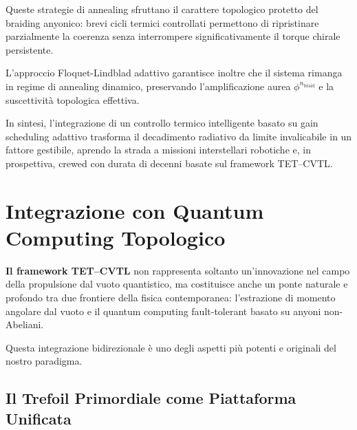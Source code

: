 \documentclass[11pt,a4paper]{article}
\theoremstyle{plain}
\theoremstyle{definition}
\begin{document}
\vspace{0.2cm}

Queste strategie di annealing sfruttano il carattere topologico protetto del braiding anyonico: brevi cicli termici controllati permettono di ripristinare parzialmente la coerenza senza interrompere significativamente il torque chirale persistente. 

\vspace{0.2cm}

L'approccio Floquet-Lindblad adattivo garantisce inoltre che il sistema rimanga in regime di annealing dinamico, preservando l'amplificazione aurea \(\phi^{n_{\text{braid}}}\) e la suscettività topologica effettiva.

\vspace{0.2cm}

In sintesi, l'integrazione di un controllo termico intelligente basato su gain scheduling adattivo trasforma il decadimento radiativo da limite invalicabile in un fattore gestibile, aprendo la strada a missioni interstellari robotiche e, in prospettiva, crewed con durata di decenni basate sul framework TET--CVTL.


\vspace{0.3cm}


\section{Integrazione con Quantum Computing Topologico}

\vspace{0.2cm}

\textbf{Il framework TET--CVTL} non rappresenta soltanto un'innovazione nel campo della propulsione dal vuoto quantistico, ma costituisce anche un ponte naturale e profondo tra due frontiere della fisica contemporanea: l'estrazione di momento angolare dal vuoto e il quantum computing fault-tolerant basato su anyoni non-Abeliani. 

\vspace{0.2cm}

Questa integrazione bidirezionale è uno degli aspetti più potenti e originali del nostro paradigma.



\vspace{0.4cm}


\subsection{Il Trefoil Primordiale come Piattaforma Unificata}
\end{document}
